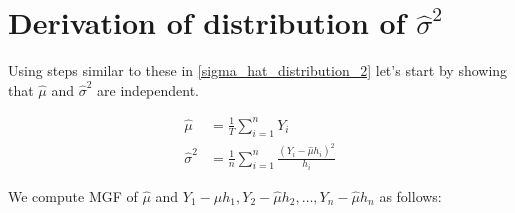 \section{Derivation of distribution of $\hat{\sigma}^2$}
\label{sigma_hat_distribution_3}

Using steps similar to these in \ref{sigma_hat_distribution_2} let's start by showing that $\hat{\mu}$ and $\hat{\sigma}^2$ are independent.

\begin{equation}
\begin{aligned}
     \hat{\mu} &= \frac{1}{T}\sum_{i=1}^{n}Y_i \\
\hat{\sigma}^2 &= \frac{1}{n}\sum_{i=1}^{n}\frac{\left(Y_i - \hat{\mu}h_i\right)^2}{h_i}
\end{aligned}
\end{equation}

We compute MGF of $\hat{\mu}$ and $Y_1-\hat{\mu}h_1, Y_2-\hat{\mu}h_2, \ldots, Y_n-\hat{\mu}h_n$ as follows:

